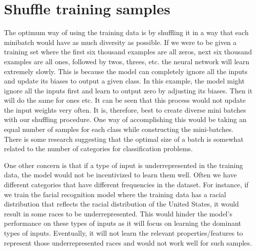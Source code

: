 {\centering{}\par}

\section{Shuffle training samples} 
The optimum way of using the training data is by shuffling it in a way that each minibatch would have as much diversity as possible. 
If we were to be given a training set where the first six thousand examples are all zeros, next six thousand examples are all ones, followed by twos, threes, etc. the neural network will learn extremely slowly. 
This is because the model can completely ignore all the inputs and update its biases to output a given class. 
In this example, the model might ignore all the inputs first and learn to output zero by adjusting its biases. 
Then it will do the same for ones etc. It can be seen that this process would not update the input weights very often. 
It is, therefore, best to create diverse mini batches with our shuffling procedure. 
One way of accomplishing this would be taking an equal number of samples for each class while constructing the mini-batches. 
There is some research suggesting that the optimal size of a batch is somewhat related to the number of categories for classification problems.

One other concern is that if a type of input is underrepresented in the training data, the model would not be incentivized to learn them well. 
Often we have different categories that have different frequencies in the dataset. 
For instance, if we train the facial recognition model where the training data has a racial distribution that reflects the racial distribution of the United States, it would result in some races to be underrepresented. 
This would hinder the model’s performance on these types of inputs as it will focus on learning the dominant types of inputs. 
Eventually, it will not learn the relevant properties/features to represent those underrepresented races and would not work well for such samples.

